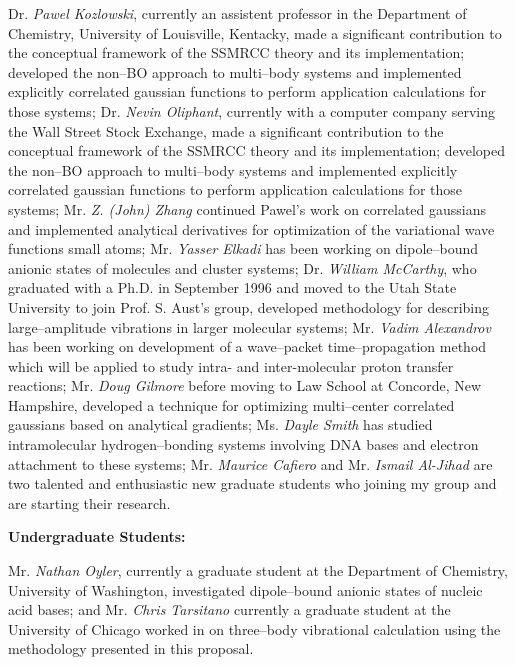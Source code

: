 \noindent
Dr. {\em Pawel Kozlowski}, currently an assistent professor
in the Department of Chemistry, 
University of Louisville, Kentacky,
made a significant contribution to the conceptual
framework of the SSMRCC theory and its implementation;
developed the non--BO approach
to multi--body systems and implemented explicitly
correlated gaussian functions to perform application
calculations for those systems;
Dr. {\em Nevin Oliphant}, currently 
with a computer company serving the Wall Street Stock Exchange,
made a significant contribution to the conceptual 
framework of the SSMRCC theory and its implementation;
developed the non--BO approach 
to multi--body systems and implemented explicitly
correlated gaussian functions to perform application 
calculations for those systems; 
Mr. {\em Z. (John) Zhang}
continued Pawel's work on correlated gaussians and 
implemented analytical derivatives for optimization of the
variational wave functions small atoms;
Mr. {\em Yasser Elkadi}
has been working on 
dipole--bound anionic states of molecules and cluster
systems; 
Dr. {\em William McCarthy}, 
who graduated 
with a Ph.D. in September 1996 and moved to the Utah
State University to join Prof. S. Aust's group,  
developed methodology for describing
large--amplitude vibrations in larger molecular systems; 
Mr. {\em Vadim Alexandrov} has been working on
development of a wave--packet time--propagation method which will
be applied to study intra- and inter-molecular proton transfer
reactions; 
Mr. {\em Doug Gilmore} before moving to Law School at Concorde,
New Hampshire,
developed a technique for
optimizing multi--center correlated gaussians
based on analytical gradients; 
Ms. {\em Dayle Smith} 
has studied 
intramolecular hydrogen--bonding
systems involving DNA bases and electron attachment to these
systems;   
Mr. {\em Maurice Cafiero} 
and Mr. {\em Ismail Al-Jihad} are two talented and 
enthusiastic new graduate students who
joining my group and are starting their research. 

\vspace{2mm}
\noindent
{\bf Undergraduate Students:}

\noindent
Mr. {\em Nathan Oyler}, 
currently a graduate student at the Department of
Chemistry, University of Washington, investigated 
dipole--bound anionic states of nucleic acid bases; and 
Mr. {\em Chris Tarsitano} currently a graduate student at the 
University of Chicago 
worked in  
on three--body vibrational calculation using the methodology
presented in this proposal.

